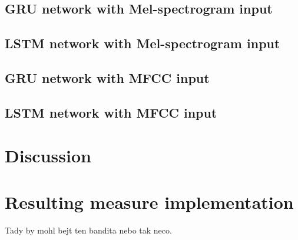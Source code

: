 \subsection{GRU network with Mel-spectrogram input}
\subsection{LSTM network with Mel-spectrogram input}
\subsection{GRU network with MFCC input}
\subsection{LSTM network with MFCC input}

\subsection{}

\section{Discussion}

\section{Resulting measure implementation}
Tady by mohl bejt ten bandita nebo tak neco.